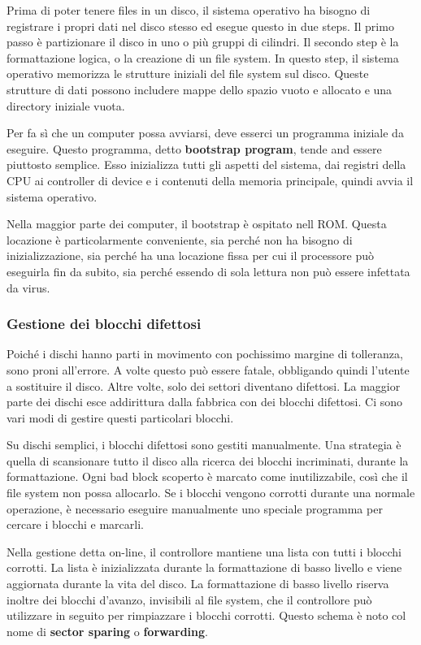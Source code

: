 \documentclass[a4paper]{article}
\begin{document}
Prima di poter tenere files in un disco, il sistema operativo ha bisogno di registrare i propri dati nel disco stesso ed esegue questo in due steps. Il primo passo è partizionare il disco in uno o più gruppi di cilindri. Il secondo step è la formattazione logica, o la creazione di un file system. In questo step, il sistema operativo memorizza le strutture iniziali del file system sul disco. Queste strutture di dati possono includere mappe dello spazio vuoto e allocato e una directory iniziale vuota.

Per fa sì che un computer possa avviarsi, deve esserci un programma iniziale da eseguire. Questo programma, detto \textbf{bootstrap program}, tende and essere piuttosto semplice. Esso inizializza tutti gli aspetti del sistema, dai registri della CPU ai controller di device e i contenuti della memoria principale, quindi avvia il sistema operativo.

Nella maggior parte dei computer, il bootstrap è ospitato nell ROM. Questa locazione è particolarmente conveniente, sia perché non ha bisogno di inizializzazione, sia perché ha una locazione fissa per cui il processore può eseguirla fin da subito, sia perché essendo di sola lettura non può essere infettata da virus.

\subsubsection{Gestione dei blocchi difettosi}
Poiché i dischi hanno parti in movimento con pochissimo margine di tolleranza, sono proni all'errore. A volte questo può essere fatale, obbligando quindi l'utente a sostituire il disco. Altre volte, solo dei settori diventano difettosi. La maggior parte dei dischi esce addirittura dalla fabbrica con dei blocchi difettosi. Ci sono vari modi di gestire questi particolari blocchi.

Su dischi semplici, i blocchi difettosi sono gestiti manualmente. Una strategia è quella di scansionare tutto il disco alla ricerca dei blocchi incriminati, durante la formattazione. Ogni bad block scoperto è marcato come inutilizzabile, così che il file system non possa allocarlo. Se i blocchi vengono corrotti durante una normale operazione, è necessario eseguire manualmente uno speciale programma per cercare i blocchi e marcarli.

Nella gestione detta on-line, il controllore mantiene una lista con tutti i blocchi corrotti. La lista è inizializzata durante la formattazione di basso livello e viene aggiornata durante la vita del disco. La formattazione di basso livello riserva inoltre dei blocchi d'avanzo, invisibili al file system, che il controllore può utilizzare in seguito per rimpiazzare i blocchi corrotti. Questo schema è noto col nome di \textbf{sector sparing} o \textbf{forwarding}.
\end{document}
